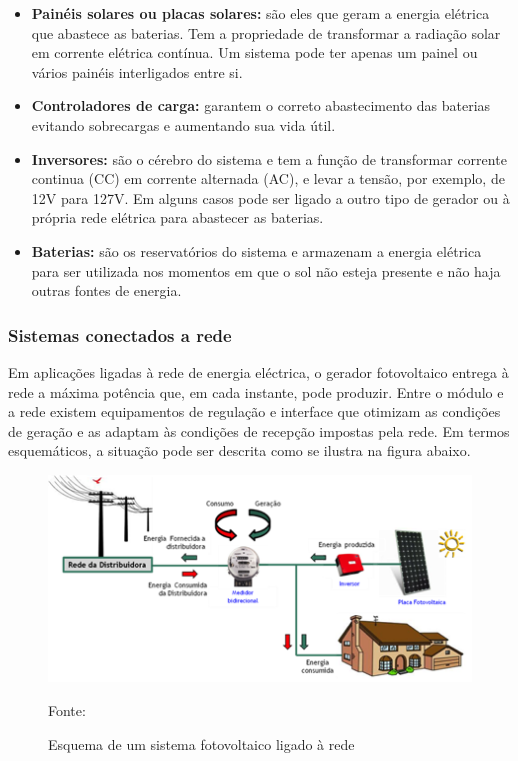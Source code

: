  \begin{itemize}
        \item \textbf{Pain\'eis solares ou placas solares:} s\~ao eles que geram a energia el\'etrica que abastece as baterias. Tem a propriedade de transformar a radia\c{c}\~ao solar em corrente el\'etrica cont\'inua. Um sistema pode ter apenas um painel ou v\'arios pain\'eis interligados entre si.
	\item \textbf{Controladores de carga:} garantem o correto abastecimento das baterias evitando sobrecargas e aumentando sua vida \'util.
	\item \textbf{Inversores:} s\~ao o c\'erebro do sistema e tem a fun\c{c}\~ao de transformar corrente continua (CC) em corrente alternada (AC), e levar a tens\~ao, por exemplo, de 12V para 127V. Em alguns casos pode ser ligado a outro tipo de gerador ou \`a pr\'opria rede el\'etrica para abastecer as baterias.
	\item \textbf{Baterias:} s\~ao os reservat\'orios do sistema e armazenam a energia el\'etrica para ser utilizada nos momentos em que o sol n\~ao esteja presente e n\~ao haja outras fontes de energia.
\end{itemize}

\subsubsection{Sistemas conectados a rede}

Em aplica\c{c}\~oes ligadas \`a rede de energia el\'ectrica, o gerador fotovoltaico entrega \`a rede a m\'axima pot\^encia que, em cada instante, pode produzir. Entre o m\'odulo e a rede existem equipamentos de regula\c{c}\~ao e interface que otimizam as condi\c{c}\~oes de gera\c{c}\~ao e as adaptam \`as condi\c{c}\~oes de recep\c{c}\~ao impostas pela rede. Em termos esquem\'aticos, a situa\c{c}\~ao pode ser descrita como se ilustra na figura abaixo.

\begin{figure}[h!]
	\centering
	\label{SistemaFotovoltaico}
		\includegraphics[keepaspectratio=true,scale=0.8]{figuras/SistemaFotovoltaico.png}
	\caption{Esquema de um sistema fotovoltaico ligado \`a rede}
	\small{Fonte:  \cite{Viridian}}
\end{figure}

